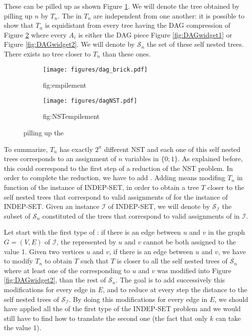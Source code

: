 These \widgets can be pilled up as shown Figure
\ref{fig:empilement}. We will denote the tree obtained by pilling up
$n$ \widgets by $T_{n}$. The \widgets in $T_{n}$ are independent from
one another: it is possible to show that $T_{n}$ is
equidistant from every tree having the DAG compression of Figure
\ref{fig:NSTempilement} where every $A_{i}$ is either the DAG piece
Figure \ref{fig:DAGwidget1} or Figure \ref{fig:DAGwidget2}. We will
denote by $\mathcal{S}_{n}$ the set of these self nested trees. There
exists no tree closer to $T_{n}$ than these ones. %

\begin{figure}
 \begin{subfigure}[b]{0.45\textwidth}
    \centering
    \texttt{[image: figures/dag\_brick.pdf]}
    \caption{fig:empilement}
    \label{fig:empilement}
  \end{subfigure}
  \quad
  \begin{subfigure}[b]{0.45\textwidth}
    \centering
    \texttt{[image: figures/dagNST.pdf]}
    \caption{fig:NSTempilement}
    \label{fig:NSTempilement}
  \end{subfigure} 
  \caption{pilling up the \widgets}\label{fig:example}
\end{figure}

To summarize, $T_{n}$ has exactly $2^{n}$ different NST and each one
of this self nested trees corresponds to an assignment of $n$
variables in $\{0;1\}$. As explained before, this could correspond to
the first step of a reduction of the NST problem. In order to complete
the reduction, we have to add \constraints. Adding \constraints means
modifing $T_{n}$ in function of the instance of INDEP-SET, in order to
obtain a tree $T$ closer to the self nested trees that correspond to valid
assignments of \variables for the instance of INDEP-SET. Given an
instance $\mathcal{I}$ of INDEP-SET, we will denote
by $\mathcal{S}_{\mathcal{I}}$ the subset of $\mathcal{S}_{n}$
constituted of the trees that correspond to valid assignments of
\variables in $\mathcal{I}$.
 
Let start with the first type of \constraint: if there is an edge
between $u$ and $v$ in the graph $G=(V,E)$ of $\mathcal{I}$, the
\variables represented by $u$ and $v$ cannot be both assigned to the
value 1. Given two vertices $u$ and $v$, if there is an edge between
$u$ and $v$, we have to modify $T_{n}$ to obtain $T$ such that $T$ is
closer to all the self nested trees of $\mathcal{S}_{n}$ where at
least one of the \widgets corresponding to $u$ and $v$ was modified
into Figure \ref{fig:DAGwidget2}, than the rest of
$\mathcal{S}_{n}$. The goal is to add successively this modifications
for every edge in $E$, and to reduce at every step the distance to the
self nested trees of $\mathcal{S}_{\mathcal{I}}$. By doing this
modifications for every edge in $E$, we should have applied all the
\constraints of the first type of the INDEP-SET problem and we would
still have to find how to translate the second one (the fact that only
$k$ \variables can take the value 1).

